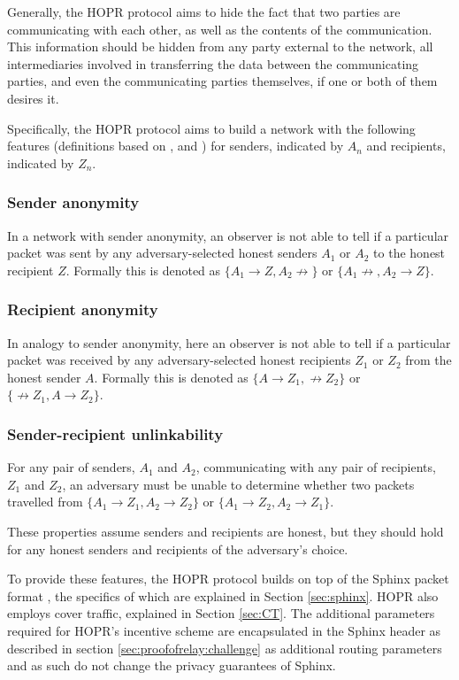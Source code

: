 Generally, the HOPR protocol aims to hide the fact that two parties are communicating with each other, as well as the contents of the communication. This information should be hidden from any party external to the network, all intermediaries involved in transferring the data between the communicating parties, and even the communicating parties themselves, if one or both of them desires it.

Specifically, the HOPR protocol aims to build a network with the following features (definitions based on \cite{AnoA}, \cite{loopix} and \cite{sphinxpaper}) for senders, indicated by $A_n$ and recipients, indicated by $Z_n$.

\subsubsection{Sender anonymity}
In a network with sender anonymity, an observer is not able to tell if a particular packet was sent by any adversary-selected honest senders $A_1$ or $A_2$ to the honest recipient $Z$. Formally this is denoted as $\{A_1 \rightarrow Z, A_2 \not\rightarrow \}$ or $\{A_1 \not\rightarrow, A_2 \rightarrow Z \}$.

\subsubsection{Recipient anonymity}
In analogy to sender anonymity, here an observer is not able to tell if a particular packet was received by any adversary-selected honest recipients $Z_1$ or $Z_2$ from the honest sender $A$. Formally this is denoted as $\{A \rightarrow Z_1, \not\rightarrow Z_2 \}$ or $\{\not\rightarrow Z_1, A \rightarrow Z_2 \}$.



\subsubsection{Sender-recipient unlinkability}
For any pair of senders, $A_1$ and $A_2$, communicating with any pair of recipients, $Z_1$ and $Z_2$, an adversary must be unable to determine whether two packets travelled from $\{A_1 \rightarrow Z_1, A_2 \rightarrow Z_2 \}$ or $\{A_1 \rightarrow Z_2, A_2 \rightarrow Z_1 \}$.


These properties assume senders and recipients are honest, but they should hold for any honest senders and recipients of the adversary's choice.

To provide these features, the HOPR protocol builds on top of the Sphinx packet format \cite{sphinxpaper}, the specifics of which are explained in Section \ref{sec:sphinx}. HOPR also employs cover traffic, explained in Section \ref{sec:CT}. The additional parameters required for HOPR's incentive scheme are encapsulated in the Sphinx header as described in section \ref{sec:proofofrelay:challenge} as additional routing parameters and as such do not change the privacy guarantees of Sphinx.



